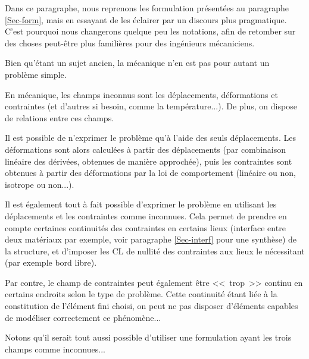 Dans ce paragraphe, nous reprenons les formulation présentées au paragraphe \ref{Sec-form},
mais en essayant de les éclairer par un discours plus pragmatique. C'est pourquoi nous
changerons quelque peu les notations, afin de retomber sur des choses peut-être plus familières
pour des ingénieurs mécaniciens.

\medskip
Bien qu'étant un sujet ancien, la mécanique n'en est pas pour autant un problème simple.

En mécanique, les champs inconnus sont les déplacements, déformations 
et contraintes (et d'autres si besoin, comme la température...). 
De plus, on dispose de relations entre ces champs.

\medskip
Il est possible de n'exprimer le problème qu'à l'aide des seuls déplacements.
Les déformations sont alors calculées à partir des déplacements (par combinaison
linéaire des dérivées, obtenues de manière approchée), puis les contraintes
sont obtenues à partir des déformations par la loi de comportement (linéaire ou non,
isotrope ou non...).

\medskip
Il est également tout à fait possible d'exprimer le problème en 
utilisant les déplacements et les contraintes comme inconnues. 
Cela permet de prendre en compte certaines continuités des contraintes en certains lieux 
(interface entre deux matériaux par exemple, voir paragraphe \ref{Sec-interf} pour une synthèse) 
de la structure, et d'imposer les CL de nullité des contraintes aux lieux le nécessitant (par exemple bord libre).

Par contre, le champ de contraintes peut également être <<~trop~>> continu
en certains endroits selon le type de problème. Cette continuité étant
liée à la constitution de l'élément fini choisi, on peut ne pas disposer
d'éléments capables de modéliser correctement ce phénomène...

\medskip
Notons qu'il serait tout aussi possible d'utiliser une formulation ayant les trois champs 
comme inconnues...



